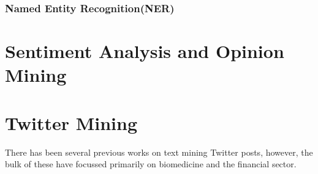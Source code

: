 \subsubsection{Named Entity Recognition(NER)}

\section[Sentiment Analysis]{Sentiment Analysis and Opinion Mining}

\section{Twitter Mining}
There has been several previous works on text mining Twitter posts, however, the bulk of these have focussed primarily on biomedicine and the financial sector.


